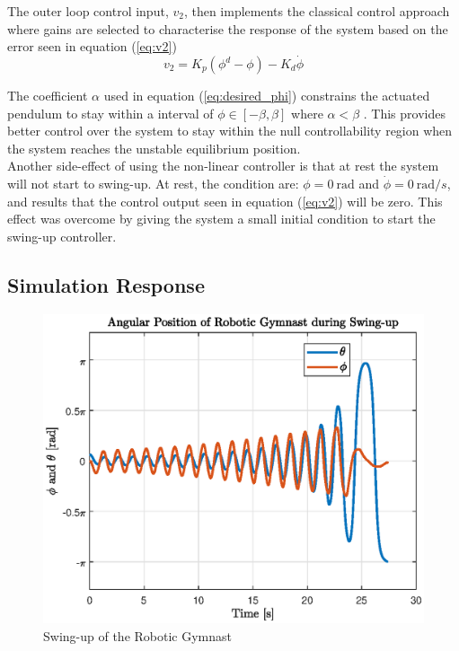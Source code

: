 The outer loop control input, $v_{2}$, then implements the classical control approach where gains are selected to characterise the response of the system based on the error seen in equation (\ref{eq:v2})   
\begin{equation} \label{eq:v2}
v_{2} = K_{p}(\phi^{d}-\phi)-K_{d}\dot{\phi}
\end{equation}

The coefficient $\alpha$ used in equation (\ref{eq:desired_phi}) constrains the actuated pendulum to stay within a interval of $ \phi \in [-\beta,\beta]$ where $\alpha < \beta$ \citep{spong_swingup}. This provides better control over the system to stay within the null controllability region when the system reaches the unstable equilibrium position.\\

Another side-effect of using the non-linear controller is that at rest the system will not start to swing-up. At rest, the condition are: $\phi = \SI{0}{\radian}$ and $\dot{\phi} = \SI{0}{\radian/s}$, and results that the control output seen in equation (\ref{eq:v2}) will be zero. This effect was overcome by giving the system a small initial condition to start the swing-up controller.


\subsection{Simulation Response}
\begin{figure}[h]
	\centering
	\includegraphics[scale=1]{./figs/swingup}
	\caption{Swing-up of the Robotic Gymnast}
	\label{fig:swingup}
\end{figure}

